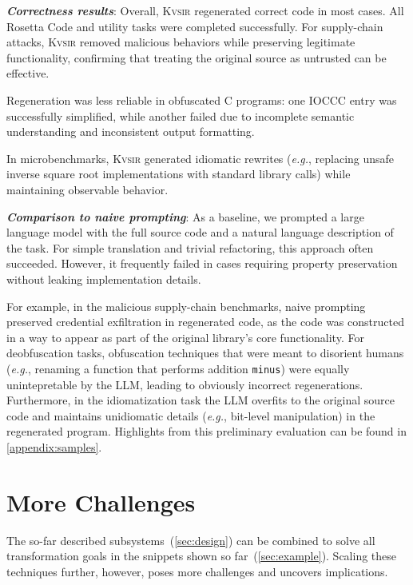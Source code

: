 \documentclass[sigplan,review,anonymous,10pt]{acmart}
\def\eg{{\em e.g.}, }
\newcommand{\sys}{{\scshape Kv{\textalpha}sir}\xspace}
\newcommand{\heading}[1]{\vspace{2pt}\noindent\textbf{\emph{#1}}:\enspace}
\newcommand{\ttt}[1]{\texttt{#1}\xspace}
\begin{document}
\heading{Correctness results}
Overall, \sys regenerated correct code in most cases. All Rosetta Code and
utility tasks were completed successfully. For supply-chain attacks, \sys
removed malicious behaviors while preserving legitimate functionality,
confirming that treating the original source as untrusted can be effective. 

Regeneration was less reliable in obfuscated C programs: one IOCCC entry was
successfully simplified, while another failed due to incomplete semantic
understanding and inconsistent output formatting.

In microbenchmarks, \sys generated idiomatic rewrites (\eg replacing unsafe
inverse square root implementations with standard library calls) while
maintaining observable behavior.

\heading{Comparison to naive prompting}
As a baseline, we prompted a large language model with the full source code and
a natural language description of the task. For simple translation and trivial
refactoring, this approach often succeeded. However, it frequently failed in
cases requiring property preservation without leaking implementation details. 

For example, in the malicious supply-chain benchmarks, naive prompting
preserved credential exfiltration in regenerated code, as the code 
was constructed in a way to appear as part of the original library's core functionality.
For deobfuscation tasks, obfuscation techniques that were meant to disorient 
humans (\eg renaming a function that performs addition \ttt{minus})
were equally unintepretable by the LLM, leading to obviously incorrect regenerations.
Furthermore, in the idiomatization task the LLM overfits 
to the original source code and maintains unidiomatic details (\eg bit-level manipulation)
in the regenerated program.
Highlights from this preliminary evaluation can be found in \cref{appendix:samples}.



\section{More Challenges}
\label{sec:limitations}

The so-far 
described subsystems~(\cref{sec:design}) can be combined to solve all transformation
goals in the snippets shown so far~(\cref{sec:example}).
Scaling these techniques further, however, poses more challenges and uncovers implications.
\end{document}
